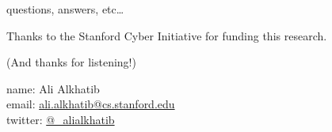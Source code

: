 \documentclass[presentation]{subfiles}
\begin{document}
  \begin{frame}{questions, answers, etc\dots}

      Thanks to the Stanford Cyber Initiative for funding this research.

      (And thanks for listening!)
  
      name: {Ali Alkhatib} \\
      email: \href{mailto:ali.alkhatib@cs.stanford.edu}{ali.alkhatib@cs.stanford.edu} \\
      twitter: \href{https://twitter.com/_alialkhatib}{@\_alialkhatib} \\
  \end{frame}
\end{document}

